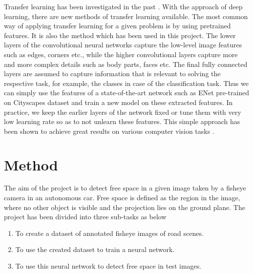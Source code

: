 \documentclass[a4paper, 12pt, oneside, BCOR1cm,toc=chapterentrywithdots]{scrbook}
\begin{document}
Transfer learning has been investigated in the past \cite{pan2010survey}. With the approach of deep learning, there are new methods of transfer learning available.
The most common way of applying transfer learning for a given problem is by using pretrained features. It is also the method which has been used in this project. The lower layers of the convolutional neural networks capture the low-level image features such as edges, corners etc., while the higher convolutional layers capture more and more complex details such as body parts, faces etc. The final fully connected layers are assumed to capture information that is relevant to solving the respective task, for example, the classes in case of the classification task.
Thus we can simply use the features of a state-of-the-art network such as ENet\cite{Paszke2017ENetAD} pre-trained on Cityscapes dataset \cite{Cordts2016Cityscapes} and train a new model on these extracted features. In practice, we keep the earlier layers of the network fixed or tune them with very low learning rate so as to not unlearn these features. This simple approach has been shown to achieve great results on various computer vision tasks \cite{pan2010survey}.


\chapter{Method}

The aim of the project is to detect free space in a given image taken by a fisheye camera in an autonomous car. Free space is defined as the region in the image, where no other object is visible and the projection lies on the ground plane. The project has been divided into three sub-tasks as below

\begin{enumerate}
	\item To create a dataset of annotated fisheye images of road scenes.
	\item To use the created dataset to train a neural network.
	\item To use this neural network to detect free space in test images.
\end{enumerate}
\end{document}
